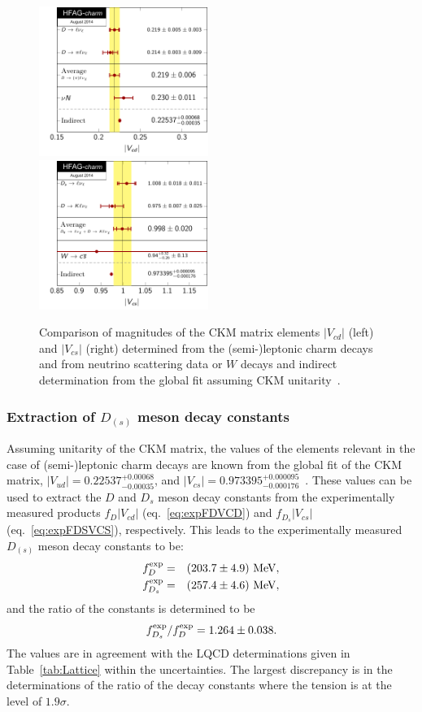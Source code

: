 \begin{figure}[hbt!]
\centering
\includegraphics[width=0.49\textwidth]{figures/charm/Vcd.pdf}~
\includegraphics[width=0.49\textwidth]{figures/charm/Vcs.pdf}
\caption{
Comparison of magnitudes of the CKM matrix elements $|V_{cd}|$ (left) and $|V_{cs}|$ (right) determined from the (semi-)leptonic charm decays and from neutrino scattering data
or $W$ decays and indirect determination from the global fit assuming CKM unitarity~\cite{CKMFitter}.
\label{fig:VcdVcsComparions}
}
\end{figure}

\subsubsection{Extraction of $D_{(s)}$ meson decay constants}

Assuming unitarity of the CKM matrix, the values of the elements relevant in the case of (semi-)leptonic charm decays are known from the global fit
of the CKM matrix, $|V_{ud}|=0.22537^{+0.00068}_{-0.00035}$, and $|V_{cs}|=0.973395^{+0.000095}_{-0.000176}$~\cite{}. These values can be used to extract
the $D$ and $D_s$ meson decay constants from the experimentally measured products $f_{D}|V_{cd}|$ (eq.~\ref{eq:expFDVCD}) and $f_{D_s}|V_{cs}|$ (eq.~\ref{eq:expFDSVCS}),
respectively. This leads to the experimentally measured $D_{(s)}$ meson decay constants to be:
\begin{eqnarray}
f_D^{\rm exp} & = & (203.7\pm4.9)~{\rm MeV,}\nonumber\\ 
f_{D_s}^{\rm exp} & = & (257.4\pm4.6)~{\rm MeV,}\nonumber\\ 
\end{eqnarray}
and the ratio of the constants is determined to be
\[
f_{D_s}^{\rm exp}/f_D^{\rm exp} = 1.264\pm0.038.
\]
The values are in agreement with the LQCD determinations given in Table~\ref{tab:Lattice} within the uncertainties. The largest discrepancy is in the determinations of 
the ratio of the decay constants where the tension is at the level of $1.9\sigma$.


